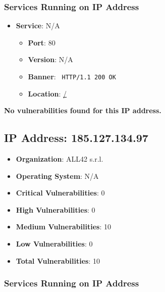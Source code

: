 \documentclass{article}
\begin{document}
\subsubsection*{Services Running on IP Address}

\begin{itemize}
    
        \item \textbf{Service}: N/A
        \begin{itemize}
            \item \textbf{Port}: 80
            \item \textbf{Version}:  N/A 
            \item \textbf{Banner}: \texttt{
                HTTP/1.1 200 OK
            }
            \item \textbf{Location}: \href{ / }{ / }
        \end{itemize}
    
\end{itemize}


\textbf{No vulnerabilities found for this IP address.}




\clearpage



\subsection*{IP Address: 185.127.134.97}

\begin{itemize}
    \item \textbf{Organization}: ALL42 s.r.l.
    \item \textbf{Operating System}:  N/A 
    \item \textbf{Critical Vulnerabilities}: 0
    \item \textbf{High Vulnerabilities}: 0
    \item \textbf{Medium Vulnerabilities}: 10
    \item \textbf{Low Vulnerabilities}: 0
    \item \textbf{Total Vulnerabilities}: 10
\end{itemize}

\subsubsection*{Services Running on IP Address}
\end{document}
